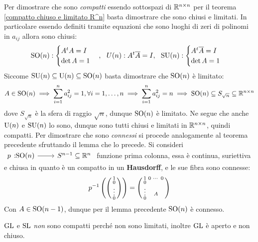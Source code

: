 \begin{theorema}
\end{theorema}
\begin{demonstration}
	Per dimostrare che sono \textit{compatti} essendo sottospazi di $\mathbb{R}^{n\times n}$ per il teorema \ref{compatto chiuso e limitato R^n} basta dimostrare che sono chiusi e limitati. In particolare essendo definiti tramite equazioni che sono luoghi di zeri di polinomi in $a_{ij}$ allora sono chiusi:
		\begin{gather*}
			\operatorname{SO}(n):\begin{cases}
					A^{t}A=I\\
					\det A=1
				\end{cases}, \ \
			U(n): A^{t}\overline{A}=I, \ \
			\operatorname{SU}(n): \begin{cases}
				A^{t}\overline{A}=I\\
				\det A=1
			\end{cases}
		\end{gather*}
	Siccome $\operatorname{SU}(n)\subseteq \operatorname{U}(n)\subseteq \operatorname{SO}(n)$ basta dimostrare che $\operatorname{SO}(n)$ è limitato:
		\begin{gather*}
			A\in\operatorname{SO}(n) \implies \sum_{i=1}^n a_{ij}^2=1, \forall i=1,\dots,n \implies \sum_{i=1}^n a_{ij}^2=n \implies \operatorname{SO}(n)\subseteq S_{\sqrt{n}}\subseteq\mathbb{R}^{n\times n}
		\end{gather*}
	dove $S_{\sqrt{n}}$ è la sfera di raggio $\sqrt{n}$, dunque $\operatorname{SO}(n)$ è limitato. Ne segue che anche $\operatorname{U}(n)$ e $\operatorname{SU}(n)$ lo sono, dunque sono tutti chiusi e limitati in $\mathbb{R}^{n\times n}$, quindi compatti. \newline
	Per dimostrare che sono \textit{connessi} si procede analogamente al teorema precedente sfruttando il lemma che lo precede. Si consideri $\funz p {\So(n)} {S^{n-1}\subseteq \realset^n}$ funzione prima colonna, essa è continua, suriettiva e chiusa in quanto è un compatto in un \textbf{Hausdorff}, e le sue fibra sono connesse:
	\begin{equation*}
		p^{-1}\left( \begin{psmallmatrix} 1 \\ 0 \\ \vdots \\ 0 \end{psmallmatrix} \right) = \begin{psmallmatrix}
			1      & 0 & \cdots & 0\\
			0      &   &       &  \\
			\vdots &   & A     &  \\
			0      &   &       &
		\end{psmallmatrix}
	\end{equation*}
Con $A\in \operatorname{SO}(n-1)$, dunque per il lemma precedente $\operatorname{SO}(n)$ è connesso.
\end{demonstration}

\begin{observe}
	$\operatorname{GL}$ e $\operatorname{SL}$ \textit{non} sono compatti perché non sono limitati, inoltre $\operatorname{GL}$ è aperto e non chiuso.
\end{observe}

